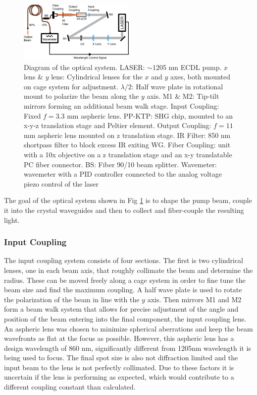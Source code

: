 \documentclass[9pt,twocolumn,twoside]{pnas-new}
\begin{document}
\begin{figure}
	\centering
	\includegraphics[width=0.5\textwidth]{diagram_presentation}
	\caption{Diagram of the optical system. LASER: $\sim$1205 nm ECDL pump. $x$ lens \& $y$ lens: Cylindrical lenses for the $x$ and $y$ axes, both mounted on cage system for adjustment. $\lambda /2$: Half wave plate in rotational mount to polarize the beam along the $y$ axis. M1 \& M2: Tip-tilt mirrors forming an additional beam walk stage. Input Coupling: Fixed $f=3.3$ mm aspheric  lens. PP-KTP: SHG chip, mounted to an x-y-z translation stage and Peltier element. Output Coupling: $f=11$ mm aspheric lens mounted on z translation stage. IR Filter: 850 nm shortpass filter to block excess IR exiting WG. Fiber Coupling: unit with a 10x objective on a z translation stage and an x-y translatable PC fiber connector. BS: Fiber 90/10 beam splitter. Wavemeter: wavemeter with a PID controller connected to the analog voltage piezo control of the laser}
	\label{fig:dia}
\end{figure}

The goal of the optical system shown in Fig \ref{fig:dia} is to shape the pump beam, couple it into the crystal waveguides and then to collect and fiber-couple the resulting light. 

\subsubsection*{Input Coupling}
The input coupling system consists of four sections. The first is two cylindrical lenses, one in each beam axis, that roughly collimate the beam and determine the radius. These can be moved freely along a cage system in order to fine tune the beam size and find the maximum coupling. A half wave plate is used to  rotate the polarization of the beam in line with the $y$ axis. Then mirrors M1 and M2 form a beam walk system that allows for precise adjustment of the angle and position of the beam entering into the final component, the input coupling lens. An aspheric lens was chosen to minimize spherical aberrations and keep the beam wavefronts as flat at the focus as possible. However, this aspheric lens has a design wavelength of 860 nm, significantly different from 1205nm wavelength it is being used to focus. The final spot size is also not diffraction limited and the input beam to the lens is not perfectly collimated. Due to these factors it is uncertain if the lens is performing as expected, which would contribute to a different coupling constant than calculated.
\end{document}
